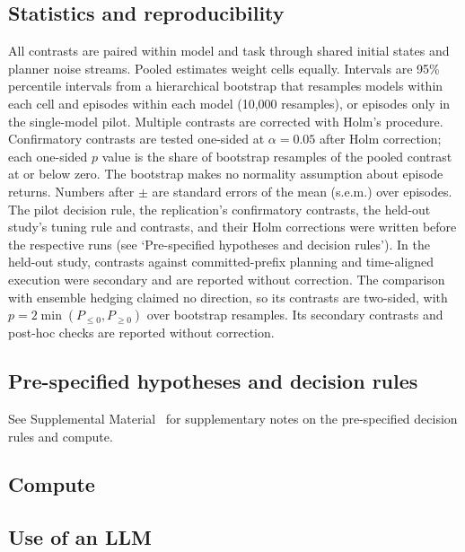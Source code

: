 \documentclass[aps,physrev,\manuscriptlayout,superscriptaddress,
  longbibliography,amsmath,amssymb]{revtex4-2}
\begin{document}
\subsection{Statistics and reproducibility}\label{sec:stats}

All contrasts are paired within model and task through shared initial states and planner noise streams. Pooled estimates weight cells equally. Intervals are 95\% percentile intervals from a hierarchical bootstrap\cite{efron1993bootstrap} that resamples models within each cell and episodes within each model (10,000 resamples), or episodes only in the single-model pilot. Multiple contrasts are corrected with Holm's procedure\cite{holm1979simple}. Confirmatory contrasts are tested one-sided at $\alpha=0.05$ after Holm correction; each one-sided $p$ value is the share of bootstrap resamples of the pooled contrast at or below zero. The bootstrap makes no normality assumption about episode returns. Numbers after $\pm$ are standard errors of the mean (s.e.m.) over episodes. The pilot decision rule, the replication's confirmatory contrasts, the held-out study's tuning rule and contrasts, and their Holm corrections were written before the respective runs (see `Pre-specified hypotheses and decision rules'). In the held-out study, contrasts against committed-prefix planning and time-aligned execution were secondary and are reported without correction. The comparison with ensemble hedging claimed no direction, so its contrasts are two-sided, with $p=2\min(P_{\le 0}, P_{\ge 0})$ over bootstrap resamples. Its secondary contrasts and post-hoc checks are reported without correction.

\subsection{Pre-specified hypotheses and decision rules}\label{app:prereg}

See Supplemental Material~\cite{supplemental} for supplementary notes on the pre-specified decision rules and compute.



\subsection{Compute}\label{app:compute}



\subsection{Use of an LLM}\label{sec:llm}
\end{document}
